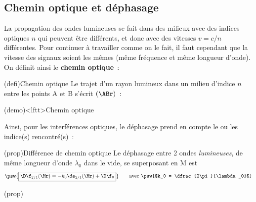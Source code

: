 \documentclass[../../main/main.tex]{subfiles}
\begin{document}
\subsection{Chemin optique et déphasage}
La propagation des ondes lumineuses se fait dans des milieux avec des indices
optiques $n$ qui peuvent être différents, et donc avec des vitesses $v = c/n$
différentes. Pour continuer à travailler comme on le fait, il faut cependant que
la vitesse des signaux soient les mêmes (même fréquence et même longueur d'onde).
On définit ainsi le \textbf{chemin optique}~:
\begin{tcb*}(defi){Chemin optique}
	Le trajet d'un rayon lumineux dans un milieu d'indice $n$ entre les points A
	et B s'écrit $(\ABr)$~:
	\psw{
		\[
			\boxed{(\ABr) = n \cdot \ABr}
		\]
	}
	\vspace{-15pt}
\end{tcb*}

\begin{tcb}(demo)<lftt>{Chemin optique}
\end{tcb}

Ainsi, pour les interférences optiques, le déphasage prend en
compte le ou les indice(s) rencontré(s)~:

\begin{tcb}(prop){Différence de chemin optique}
	Le déphasage entre 2 ondes \textit{lumineuses}, de même longueur d'onde
	$\lambda_0$ dans le vide, se superposant en M est
	\[
		\psw{%
			\boxed{\D\f_{2/1}(\Mr) = -k_0\de_{2/1}(\Mr) + \D\f_0}
		}
		\tag*{avec \psw{$k_0 = \dfrac{2\pi}{\lambda_0}$}}
	\]
	\smallbreak
	\begin{isd}(prop)
		\psw{%
			\[
				\boxed{\delta_{2/1}(\Mr) = (\SbMr) - (\SaMr)}
			\]
		}%
		\vspace{-15pt}
		\tcblower
		\psw{%
			\[
				\boxed{\D\f_0 = \f_{02}-\f_{01}}
			\]
		}%
		\vspace{-15pt}
	\end{isd}
\end{tcb}
\end{document}
